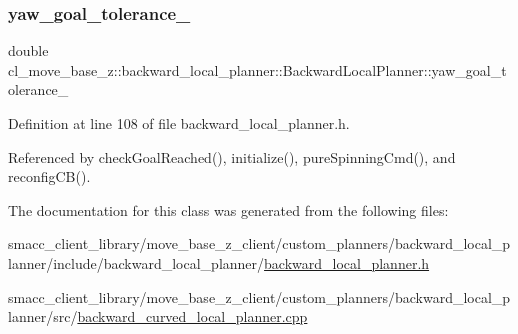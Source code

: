 \subsubsection{\texorpdfstring{yaw\+\_\+goal\+\_\+tolerance\+\_\+}{yaw\_goal\_tolerance\_}}
{\footnotesize\ttfamily double cl\+\_\+move\+\_\+base\+\_\+z\+::backward\+\_\+local\+\_\+planner\+::\+Backward\+Local\+Planner\+::yaw\+\_\+goal\+\_\+tolerance\+\_\+\hspace{0.3cm}{\ttfamily [private]}}



Definition at line 108 of file backward\+\_\+local\+\_\+planner.\+h.



Referenced by check\+Goal\+Reached(), initialize(), pure\+Spinning\+Cmd(), and reconfig\+C\+B().



The documentation for this class was generated from the following files\+:\begin{DoxyCompactItemize}
\item 
smacc\+\_\+client\+\_\+library/move\+\_\+base\+\_\+z\+\_\+client/custom\+\_\+planners/backward\+\_\+local\+\_\+planner/include/backward\+\_\+local\+\_\+planner/\hyperlink{backward__local__planner_8h}{backward\+\_\+local\+\_\+planner.\+h}\item 
smacc\+\_\+client\+\_\+library/move\+\_\+base\+\_\+z\+\_\+client/custom\+\_\+planners/backward\+\_\+local\+\_\+planner/src/\hyperlink{backward__curved__local__planner_8cpp}{backward\+\_\+curved\+\_\+local\+\_\+planner.\+cpp}\end{DoxyCompactItemize}
